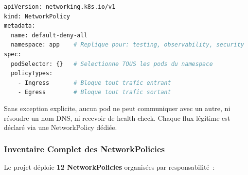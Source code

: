 \begin{lstlisting}[language=bash, caption=Politique default-deny appliquée à chaque namespace]
apiVersion: networking.k8s.io/v1
kind: NetworkPolicy
metadata:
  name: default-deny-all
  namespace: app    # Replique pour: testing, observability, security
spec:
  podSelector: {}   # Selectionne TOUS les pods du namespace
  policyTypes:
    - Ingress       # Bloque tout trafic entrant
    - Egress        # Bloque tout trafic sortant
\end{lstlisting}

Sans exception explicite, aucun pod ne peut communiquer avec un autre, ni résoudre un nom
DNS, ni recevoir de health check. Chaque flux légitime est déclaré via une NetworkPolicy dédiée.

\subsubsection{Inventaire Complet des NetworkPolicies}

Le projet déploie \textbf{12 NetworkPolicies} organisées par responsabilité~:

